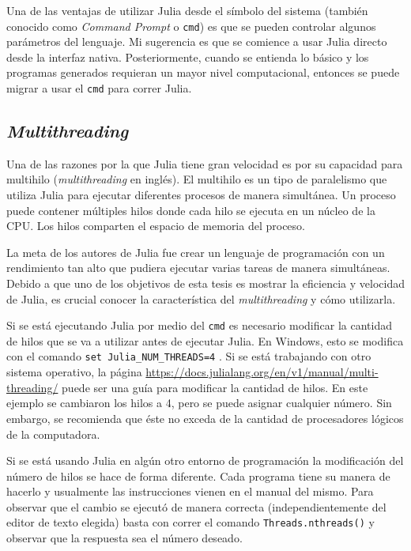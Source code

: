 Una de las ventajas de utilizar \textsf{Julia} desde el símbolo del sistema (también conocido como \textit{Command Prompt} o \texttt{cmd}) es que se pueden controlar algunos parámetros del lenguaje. Mi sugerencia es que se comience a usar \textsf{Julia} directo desde la interfaz nativa. Posteriormente, cuando se entienda lo básico y los programas generados requieran un mayor nivel computacional, entonces se puede migrar a usar el \texttt{cmd} para correr \textsf{Julia}. 

\subsection{\textit{Multithreading}}
Una de las razones por la que \textsf{Julia} tiene gran velocidad es por su capacidad para multihilo (\textit{multithreading} en inglés). El multihilo es un tipo de paralelismo que utiliza \textsf{Julia} para ejecutar diferentes procesos de manera simultánea. Un proceso puede contener múltiples hilos donde cada hilo se ejecuta en un núcleo de la CPU. Los hilos comparten el espacio de memoria del proceso. 

La meta de los autores de \textsf{Julia} fue crear un lenguaje de programación con un rendimiento tan alto que pudiera ejecutar varias tareas de manera simultáneas. Debido a que uno de los objetivos de esta tesis es mostrar la eficiencia y velocidad de \textsf{Julia}, es crucial conocer la característica del \textit{multithreading} y cómo utilizarla. 

Si se está ejecutando \textsf{Julia} por medio del \texttt{cmd} es necesario modificar la cantidad de hilos que se va a utilizar antes de ejecutar \textsf{Julia}.  En \textsf{Windows}, esto se modifica con el comando \texttt{set Julia\_NUM\_THREADS=4} \citep{manual_Julia}. Si se está trabajando con otro sistema operativo, la página \url{https://docs.julialang.org/en/v1/manual/multi-threading/}
puede ser una guía para modificar la cantidad de hilos. En este ejemplo se cambiaron los hilos a 4, pero se puede asignar cualquier número. Sin embargo, se recomienda que éste no exceda de la cantidad de procesadores lógicos de la computadora.  

Si se está usando \textsf{Julia} en algún otro entorno de programación la modificación del número de hilos se hace de forma diferente. Cada programa tiene su manera de hacerlo y usualmente las instrucciones vienen en el manual del mismo. Para observar que el cambio se ejecutó de manera correcta (independientemente del editor de texto elegida) basta con correr el comando \texttt{Threads.nthreads()} y observar que la respuesta sea el número deseado.

